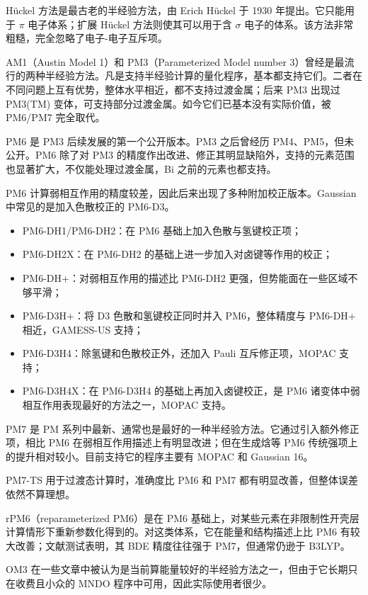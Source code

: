 H\"uckel 方法是最古老的半经验方法，由 Erich H\"uckel 于 1930 年提出。它只能用于 $\pi$ 电子体系；扩展 H\"uckel 方法则使其可以用于含 $\sigma$ 电子的体系。该方法非常粗糙，完全忽略了电子-电子互斥项。

AM1（Austin Model 1）和 PM3（Parameterized Model number 3）曾经是最流行的两种半经验方法。凡是支持半经验计算的量化程序，基本都支持它们。二者在不同问题上互有优势，整体水平相近，都不支持过渡金属；后来 PM3 出现过 PM3(TM) 变体，可支持部分过渡金属。如今它们已基本没有实际价值，被 PM6/PM7 完全取代。

PM6 是 PM3 后续发展的第一个公开版本。PM3 之后曾经历 PM4、PM5，但未公开。PM6 除了对 PM3 的精度作出改进、修正其明显缺陷外，支持的元素范围也显著扩大，不仅能处理过渡金属，Bi 之前的元素也都支持。

PM6 计算弱相互作用的精度较差，因此后来出现了多种附加校正版本。Gaussian 中常见的是加入色散校正的 PM6-D3。

\begin{itemize}
  \item PM6-DH1/PM6-DH2：在 PM6 基础上加入色散与氢键校正项；
  \item PM6-DH2X：在 PM6-DH2 的基础上进一步加入对卤键等作用的校正；
  \item PM6-DH+：对弱相互作用的描述比 PM6-DH2 更强，但势能面在一些区域不够平滑；
  \item PM6-D3H+：将 D3 色散和氢键校正同时并入 PM6，整体精度与 PM6-DH+ 相近，GAMESS-US 支持；
  \item PM6-D3H4：除氢键和色散校正外，还加入 Pauli 互斥修正项，MOPAC 支持；
  \item PM6-D3H4X：在 PM6-D3H4 的基础上再加入卤键校正，是 PM6 诸变体中弱相互作用表现最好的方法之一，MOPAC 支持。
\end{itemize}

PM7 是 PM 系列中最新、通常也是最好的一种半经验方法。它通过引入额外修正项，相比 PM6 在弱相互作用描述上有明显改进；但在生成焓等 PM6 传统强项上的提升相对较小。目前支持它的程序主要有 MOPAC 和 Gaussian 16。

PM7-TS 用于过渡态计算时，准确度比 PM6 和 PM7 都有明显改善，但整体误差依然不算理想。

rPM6（reparameterized PM6）是在 PM6 基础上，对某些元素在非限制性开壳层计算情形下重新参数化得到的。对这类体系，它在能量和结构描述上比 PM6 有较大改善；文献测试表明，其 BDE 精度往往强于 PM7，但通常仍逊于 B3LYP。

OM3 在一些文章中被认为是当前算能量较好的半经验方法之一，但由于它长期只在收费且小众的 MNDO 程序中可用，因此实际使用者很少。


